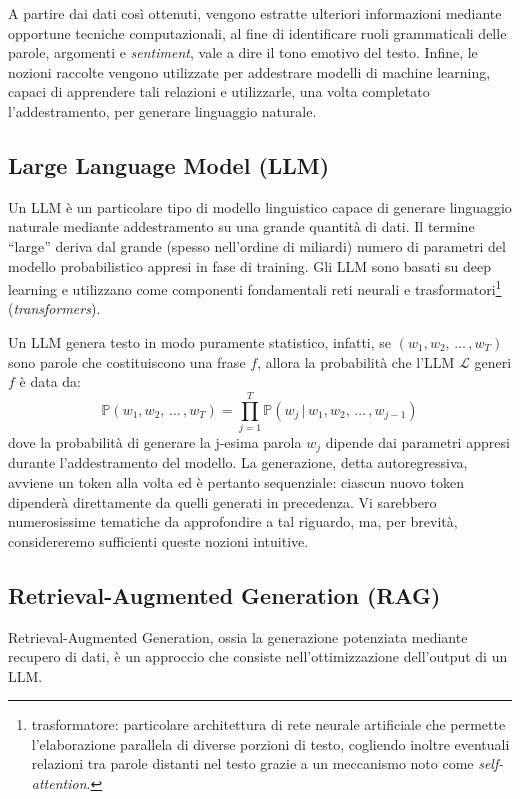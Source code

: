 A partire dai dati così ottenuti, vengono estratte ulteriori informazioni mediante opportune tecniche computazionali, al fine di identificare ruoli grammaticali delle parole, argomenti e \textit{sentiment}, vale a dire il tono emotivo del testo. Infine, le nozioni raccolte vengono utilizzate per addestrare modelli di machine learning, capaci di apprendere tali relazioni e utilizzarle, una volta completato l'addestramento, per generare linguaggio naturale.         

\subsection{Large Language Model (LLM)}
Un LLM è un particolare tipo di modello linguistico capace di generare linguaggio naturale mediante addestramento su una grande quantità di dati. Il termine ``large'' deriva dal grande (spesso nell'ordine di miliardi) numero di parametri del modello probabilistico appresi in fase di training. Gli LLM sono basati su deep learning e utilizzano come componenti fondamentali reti neurali e trasformatori\footnote {trasformatore: particolare architettura di rete neurale artificiale che permette l'elaborazione parallela di diverse porzioni di testo, cogliendo inoltre eventuali relazioni tra parole distanti nel testo grazie a un meccanismo noto come \textit{self-attention}.} (\textit{transformers}).

Un LLM genera testo in modo puramente statistico, infatti, se \((w_1, w_2,\, \dots \,, w_T)\) sono parole che costituiscono una frase $f$, allora la probabilità che l'LLM $\mathscr{L}$ generi $f$ è data da: 
\[\mathbb{P}(w_1, w_2,\, \dots \,, w_T) = \prod_{j=1}^{T} \mathbb{P}(w_j \, | \, w_1, w_2,\, \dots \,, w_{j-1})\]
dove la probabilità di generare la j-esima parola $w_j$ dipende dai parametri appresi durante l'addestramento del modello. La generazione, detta autoregressiva, avviene un token alla volta ed è pertanto sequenziale:  ciascun nuovo token dipenderà direttamente da quelli generati in precedenza. Vi sarebbero numerosissime tematiche da approfondire a tal riguardo, ma, per brevità, considereremo sufficienti queste nozioni intuitive.  

\subsection{Retrieval-Augmented Generation (RAG)}
Retrieval-Augmented Generation, ossia la generazione potenziata mediante recupero di dati, è un approccio che consiste nell'ottimizzazione dell'output di un LLM.

